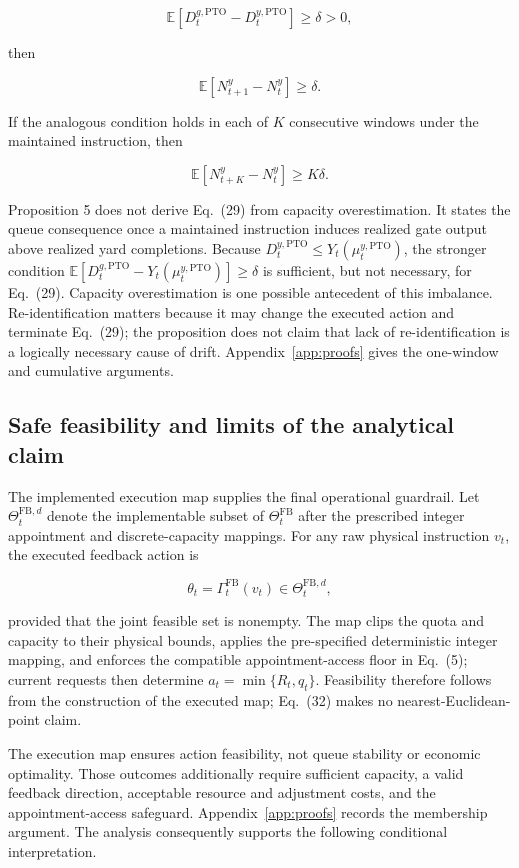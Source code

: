 \documentclass[preprint,12pt,authoryear,a4paper]{elsarticle}
\begin{document}
\[
\mathbb E[D_t^{g,\mathrm{PTO}}-D_t^{y,\mathrm{PTO}}]
\ge\delta>0,
\tag{29}
\]

then

\[
\mathbb E[N_{t+1}^y-N_t^y]\ge\delta.
\tag{30}
\]

If the analogous condition holds in each of \(K\) consecutive windows under the maintained instruction, then

\[
\mathbb E[N_{t+K}^y-N_t^y]\ge K\delta.
\tag{31}
\]

Proposition 5 does not derive Eq.~(29) from capacity overestimation. It states the queue consequence once a maintained instruction induces realized gate output above realized yard completions. Because \(D_t^{y,\mathrm{PTO}}\le Y_t(\mu_t^{y,\mathrm{PTO}})\), the stronger condition \(\mathbb E[D_t^{g,\mathrm{PTO}}-Y_t(\mu_t^{y,\mathrm{PTO}})]\ge\delta\) is sufficient, but not necessary, for Eq.~(29). Capacity overestimation is one possible antecedent of this imbalance. Re-identification matters because it may change the executed action and terminate Eq.~(29); the proposition does not claim that lack of re-identification is a logically necessary cause of drift. Appendix~\ref{app:proofs} gives the one-window and cumulative arguments.

\subsection{Safe feasibility and limits of the analytical claim}
\label{subsec:5-4-safe-feasibility-and-limits-of-the-analytical-claim}

The implemented execution map supplies the final operational guardrail. Let \(\Theta_t^{\mathrm{FB},d}\) denote the implementable subset of \(\Theta_t^{\mathrm{FB}}\) after the prescribed integer appointment and discrete-capacity mappings. For any raw physical instruction \(v_t\), the executed feedback action is

\[
\theta_t
=\Gamma_t^{\mathrm{FB}}(v_t)
\in\Theta_t^{\mathrm{FB},d},
\tag{32}
\]

provided that the joint feasible set is nonempty. The map clips the quota and capacity to their physical bounds, applies the pre-specified deterministic integer mapping, and enforces the compatible appointment-access floor in Eq.~(5); current requests then determine \(a_t=\min\{R_t,q_t\}\). Feasibility therefore follows from the construction of the executed map; Eq.~(32) makes no nearest-Euclidean-point claim.

The execution map ensures action feasibility, not queue stability or economic optimality. Those outcomes additionally require sufficient capacity, a valid feedback direction, acceptable resource and adjustment costs, and the appointment-access safeguard. Appendix~\ref{app:proofs} records the membership argument. The analysis consequently supports the following conditional interpretation.
\end{document}
